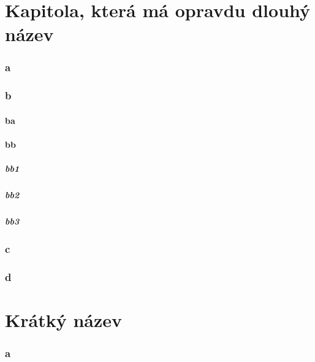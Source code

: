 \part{Kapitola, která má opravdu dlouhý název}
\lipsum[2]
\section{a}\lipsum [2]
\section{b}\lipsum
\subsection{ba}\lipsum [3]
\subsection{bb}\lipsum
\subsubsection{bb1}\lipsum [6]
\subsubsection{bb2}\lipsum
\subsubsection{bb3}\lipsum [4] 
\section{c}\lipsum
\section{d}\lipsum [1]
\clearpage
\part{Krátký název}
\lipsum[2]
\section{a}\lipsum